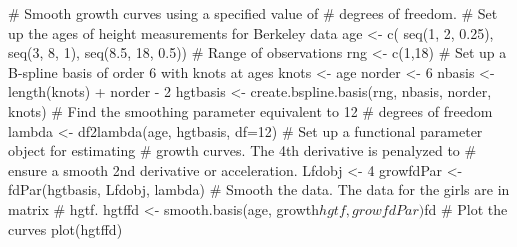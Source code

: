 \begin{Examples}
\begin{ExampleCode}

#  Smooth growth curves using a specified value of
#  degrees of freedom.
#  Set up the ages of height measurements for Berkeley data
age <- c( seq(1, 2, 0.25), seq(3, 8, 1), seq(8.5, 18, 0.5))
#  Range of observations
rng <- c(1,18)
#  Set up a B-spline basis of order 6 with knots at ages
knots  <- age
norder <- 6
nbasis <- length(knots) + norder - 2
hgtbasis <- create.bspline.basis(rng, nbasis, norder, knots)
#  Find the smoothing parameter equivalent to 12
#  degrees of freedom
lambda <- df2lambda(age, hgtbasis, df=12)
#  Set up a functional parameter object for estimating
#  growth curves.  The 4th derivative is penalyzed to
#  ensure a smooth 2nd derivative or acceleration.
Lfdobj <- 4
growfdPar <- fdPar(hgtbasis, Lfdobj, lambda)
#  Smooth the data.  The data for the girls are in matrix
#  hgtf.
hgtffd <- smooth.basis(age, growth$hgtf, growfdPar)$fd
#  Plot the curves
plot(hgtffd)

\end{ExampleCode}
\end{Examples}

